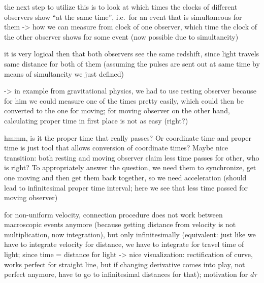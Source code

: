 the next step to utilize this is to look at which times the clocks of different observers show \enquote{at the same time}, i.e.~for an event that is simultaneous for them -> how we can measure from clock of one observer, which time the clock of the other observer shows for some event (now possible due to simultaneity)


it is very logical then that both observers see the same redshift, since light travels same distance for both of them (assuming the pulses are sent out at same time by means of simultaneity we just defined)

-> in example from gravitational physics, we had to use resting observer because for him we could measure one of the times pretty easily, which could then be converted to the one for moving; for moving observer on the other hand, calculating proper time in first place is not as easy (right?)



hmmm, is it the proper time that really passes? Or coordinate time and proper time is just tool that allows conversion of coordinate times? Maybe nice transition: both resting and moving observer claim less time passes for other, who is right? To appropriately answer the question, we need them to synchronize, get one moving and then get them back together, so we need acceleration (should lead to infinitesimal proper time interval; here we see that less time passed for moving observer)


for non-uniform velocity, connection procedure does not work between macroscopic events anymore (because getting distance from velocity is not multiplication, now integration), but only infinitesimally (equivalent: just like we have to integrate velocity for distance, we have to integrate for travel time of light; since time = distance for light -> nice visualization: rectification of curve, works perfect for straight line, but if changing derivative comes into play, not perfect anymore, have to go to infinitesimal distances for that); motivation for $d\tau$


